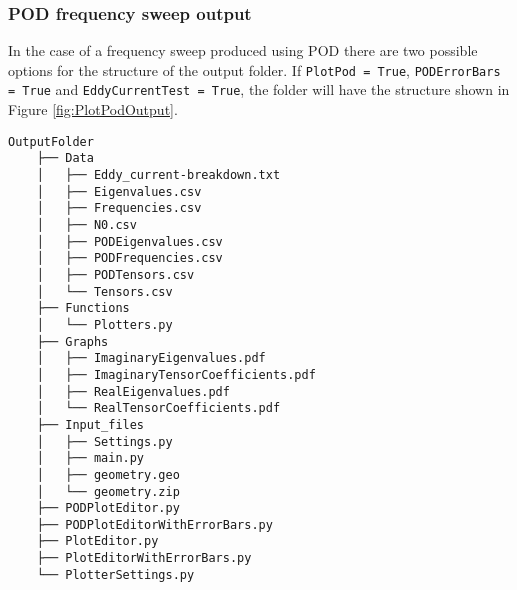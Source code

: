 \subsubsection{POD frequency sweep output}
In the case of a frequency sweep produced using POD there are two possible options for the structure of the output folder. If \texttt{PlotPod = True}, \texttt{PODErrorBars = True} and \texttt{EddyCurrentTest = True}, the folder will have the structure shown in Figure \ref{fig:PlotPodOutput}.

\clearpage
\begin{Verbatim}
OutputFolder
    ├── Data
    │   ├── Eddy_current-breakdown.txt
    │   ├── Eigenvalues.csv
    │   ├── Frequencies.csv
    │   ├── N0.csv
    │   ├── PODEigenvalues.csv
    │   ├── PODFrequencies.csv
    │   ├── PODTensors.csv
    │   └── Tensors.csv
    ├── Functions
    │   └── Plotters.py
    ├── Graphs
    │   ├── ImaginaryEigenvalues.pdf
    │   ├── ImaginaryTensorCoefficients.pdf
    │   ├── RealEigenvalues.pdf
    │   └── RealTensorCoefficients.pdf
    ├── Input_files
    │   ├── Settings.py
    │   ├── main.py
    │   ├── geometry.geo
    │   └── geometry.zip
    ├── PODPlotEditor.py
    ├── PODPlotEditorWithErrorBars.py
    ├── PlotEditor.py
    ├── PlotEditorWithErrorBars.py
    └── PlotterSettings.py
\end{Verbatim}


